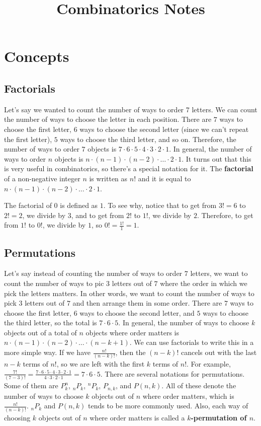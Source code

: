 \documentclass[twocolumn]{article}
\title{Combinatorics Notes}
\author{}
\date{}
\begin{document}
\maketitle

\section*{Concepts}

\subsection*{Factorials}
Let's say we wanted to count the number of ways to order $7$ letters. We can 
count the number of ways to choose the letter in each position. There are $7$ 
ways to choose the first letter, $6$ ways to choose the second letter (since we 
can't repeat the first letter), $5$ ways to choose the third letter, and so on.  
Therefore, the number of ways to order $7$ objects is $7 \cdot 6 \cdot 5 \cdot 4 
\cdot 3 \cdot 2 \cdot 1$. In general, the number of ways to order $n$ objects is 
$n \cdot (n - 1) \cdot (n - 2) \cdot \dots \cdot 2 \cdot 1$. It turns out that 
this is very useful in combinatorics, so there's a special notation for it. The 
\textbf{factorial} of a non-negative integer $n$ is written as $n!$ and it is 
equal to $n \cdot (n - 1) \cdot (n - 2) \cdot \dots \cdot 2 \cdot 1$.

The factorial of $0$ is defined as $1$. To see why, notice that to get from $3!  
= 6$ to $2! = 2$, we divide by $3$, and to get from $2!$ to $1!$, we divide by 
$2$. Therefore, to get from $1!$ to $0!$, we divide by $1$, so $0! = 
\frac{1!}{1} = 1$.

\subsection*{Permutations}
Let's say instead of counting the number of ways to order $7$ letters, we want 
to count the number of ways to pic $3$ letters out of $7$ where the order in 
which we pick the letters matters. In other words, we want to count the number 
of ways to pick $3$ letters out of $7$ and then arrange them in some order.  
There are $7$ ways to choose the first letter, $6$ ways to choose the second 
letter, and $5$ ways to choose the third letter, so the total is $7 \cdot 6 
\cdot 5$. In general, the number of ways to choose $k$ objects out of a total of 
$n$ objects where order matters is $n \cdot (n - 1) \cdot (n - 2) \cdot \dots 
\cdot (n - k + 1)$. We can use factorials to write this in a more simple way. If 
we have $\frac{n!}{(n - k)!}$, then the $(n - k)!$ cancels out with the last $n 
- k$ terms of $n!$, so we are left with the first $k$ terms of $n!$. For 
example, $\frac{7!}{(7 - 3)!} = \frac{7 \cdot 6 \cdot 5 \cdot 4 \cdot 3 \cdot 2 
\cdot 1}{4 \cdot 3 \cdot 2 \cdot 1} = 7 \cdot 6 \cdot 5$. There are several 
notations for permutations. Some of them are $P^n_k$, $_nP_k$, $^nP_k$, $P_{n, 
k}$, and $P(n, k)$. All of these denote the number of ways to choose $k$ objects 
out of $n$ where order matters, which is $\frac{n!}{(n - k)!}$. $_nP_k$ and 
$P(n, k)$ tends to be more commonly used. Also, each way of choosing $k$ objects 
out of $n$ where order matters is called a \textbf{$k$-permutation of $n$}.
\end{document}
